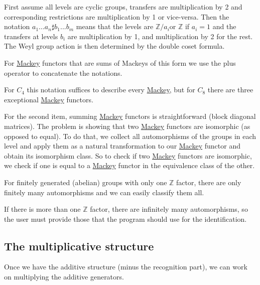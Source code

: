 \begin{DoxyItemize}
\item First assume all levels are cyclic groups, transfers are multiplication by 2 and corresponding restrictions are multiplication by 1 or vice-\/versa. Then the notation $a_1...a_n \sharp b_1...b_m$ means that the levels are $\mathbb Z/a_i$or $\mathbb Z$ if $a_i=1$ and the transfers at levels $b_i$ are multiplication by 1, and multiplication by 2 for the rest. The Weyl group action is then determined by the double coset formula.
\item For \hyperlink{namespaceMackey}{Mackey} functors that are sums of Mackeys of this form we use the plus operator to concatenate the notations.
\item For $C_4$ this notation suffices to describe every \hyperlink{namespaceMackey}{Mackey}, but for $C_8$ there are three exceptional \hyperlink{namespaceMackey}{Mackey} functors.
\end{DoxyItemize}

For the second item, summing \hyperlink{namespaceMackey}{Mackey} functors is straightforward (block diagonal matrices). The problem is showing that two \hyperlink{namespaceMackey}{Mackey} functors are isomorphic (as opposed to equal). To do that, we collect all automorphisms of the groups in each level and apply them as a natural transformation to our \hyperlink{namespaceMackey}{Mackey} functor and obtain its isomorphism class. So to check if two \hyperlink{namespaceMackey}{Mackey} functors are isomorphic, we check if one is equal to a \hyperlink{namespaceMackey}{Mackey} functor in the equivalence class of the other.


\begin{DoxyItemize}
\item For finitely generated (abelian) groups with only one $\mathbb Z$ factor, there are only finitely many automorphisms and we can easily classify them all.
\item If there is more than one $\mathbb Z$ factor, there are infinitely many automorphisms, so the user must provide those that the program should use for the identification.
\end{DoxyItemize}\hypertarget{math_mult}{}\subsection{The multiplicative structure}\label{math_mult}
Once we have the additive structure (minus the recognition part), we can work on multiplying the additive generators.



